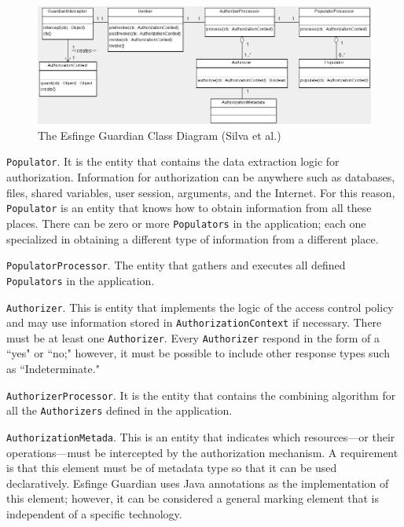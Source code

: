 \documentclass[sigconf]{acmart}
\begin{document}
\begin{figure}
 \centering
 \includegraphics[scale=0.4]{img/guardian-class-diagram.png}
 \caption{The Esfinge Guardian Class Diagram (Silva et al.\cite{Silva2013})}
 \label{fig:class-diagram}
\end{figure}

\vspace{0.8mm} \noindent \verb|Populator|.
It is the entity that contains the data extraction logic for authorization. Information for authorization can be anywhere such as databases, files, shared variables, user session, arguments, and the Internet. For this reason, \verb|Populator| is an entity that knows how to obtain information from all these places.
There can be zero or more \verb|Populators| in the application; each one specialized in obtaining a different type of information from a different place.

\vspace{0.8mm} \noindent \verb|PopulatorProcessor|.
The entity that gathers and executes all defined \verb|Populators| in the application.

\vspace{0.8mm} \noindent \verb|Authorizer|. This is entity that implements the logic of the access control policy and may use information stored in \verb|AuthorizationContext| if necessary. There must be at least one \verb|Authorizer|. Every \verb|Authorizer| respond in the form of a ``yes" or ``no;" however, it must be possible to include other response types such as ``Indeterminate."

\vspace{0.8mm} \noindent \verb|AuthorizerProcessor|.
It is the entity that contains the combining algorithm for all the \verb|Authorizers| defined in the application.

\vspace{0.8mm} \noindent \verb|AuthorizationMetada|.
This is an entity that indicates which resources---or their operations---must be intercepted by the authorization mechanism. A requirement is that this element must be of metadata type so that it can be used declaratively. Esfinge Guardian uses Java annotations as the implementation of this element; however, it can be considered a general marking element that is independent of a specific technology.
\end{document}
